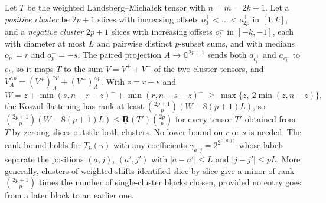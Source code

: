 \begin{theorem}
  \label{thm:frontiers-paired-koszul}
  \leanok
  Let $T$ be the weighted Landsberg--Micha{\l}ek tensor with $n = m = 2k + 1$. Let a
  \emph{positive cluster} be $2p + 1$ slices with increasing offsets
  $o^+_0 < \dots < o^+_{2p}$ in $[1, k]$, and a \emph{negative cluster} $2p + 1$ slices with
  increasing offsets $o^-_t$ in $[-k, -1]$, each with diameter at most $L$ and pairwise
  distinct $p$-subset sums, and with medians $o^+_p = r$ and $o^-_p = -s$. The paired
  projection $A \to \mathbb{C}^{2p+1}$ sends both $a_{c^+_t}$ and $a_{c^-_t}$ to $e_t$, so it
  maps $T$ to the sum $V = V^+ + V^-$ of the two cluster tensors, and
  $V_A^{\wedge p} = (V^+)_A^{\wedge p} + (V^-)_A^{\wedge p}$. With $z = r + s$ and
  \[
    W = z + \min(s, n - r - z)^+ + \min(r, n - s - z)^+
      \ \ge\ \max\{z,\ 2 \min(z, n - z)\},
  \]
  the Koszul flattening has rank at least $\binom{2p+1}{p} (W - 8(p + 1)L)$, so
  $\binom{2p+1}{p} (W - 8(p + 1)L) \le \underline{\mathbf{R}}(T') \binom{2p}{p}$ for every
  tensor $T'$ obtained from $T$ by zeroing slices outside both clusters. No lower bound on
  $r$ or $s$ is needed. The rank bound holds for $T_k(\gamma)$ with any coefficients
  $\gamma_{a, j} = 2^{2^{e(a, j)}}$ whose labels separate the positions $(a, j)$, $(a', j')$
  with $|a - a'| \le L$ and $|j - j'| \le pL$. More generally, clusters of weighted shifts
  identified slice by slice give a minor of rank $\binom{2p+1}{p}$ times the number of
  single-cluster blocks chosen, provided no entry goes from a later block to an earlier one.
\end{theorem}
